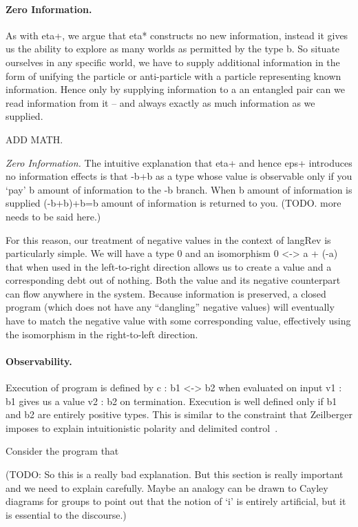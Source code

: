 \documentclass[preprint]{sigplanconf}
\begin{document}
\paragraph*{Zero Information.}
As with {{eta+}}, we argue that {{eta*}} constructs no new
information, instead it gives us the ability to explore as many worlds
as permitted by the type {{b}}. So situate ourselves in any specific
world, we have to supply additional information in the form of
unifying the particle or anti-particle with a particle representing
known information. Hence only by supplying information to a an
entangled pair can we read information from it -- and always exactly
as much information as we supplied.

ADD MATH. 

\emph{Zero Information.}  The intuitive explanation that {{eta+}} and
hence {{eps+}} introduces no information effects is that {{-b+b}} as a
type whose value is observable only if you `pay' {{b}} amount of
information to the {{-b}} branch. When {{b}} amount of information is
supplied {{(-b+b)+b=b}} amount of information is returned to
you. (TODO. more needs to be said here.)

For this reason, our treatment of negative values in the context of
{{langRev}} is particularly simple. We will have a type $0$ and an
isomorphism {{0 <-> a + (-a)}} that when used in the left-to-right direction
allows us to create a value and a corresponding debt out of nothing. Both the
value and its negative counterpart can flow anywhere in the system. Because
information is preserved, a closed program (which does not have any
``dangling'' negative values) will eventually have to match the negative
value with some corresponding value, effectively using the isomorphism in the
right-to-left direction. 



\paragraph*{Observability.} 
Execution of program is defined by {{c : b1 <-> b2}} when evaluated on input
{{v1 : b1}} gives us a value {{v2 : b2}} on termination. Execution is well
defined only if {{b1}} and {{b2}} are entirely positive types. This is
similar to the constraint that Zeilberger imposes to explain intuitionistic
polarity and delimited control~\cite{10.1109/LICS.2010.23}.

Consider the program that

(TODO: So this is a really bad explanation. But this section is really
important and we need to explain carefully. Maybe an analogy can be
drawn to Cayley diagrams for groups to point out that the notion of
`i' is entirely artificial, but it is essential to the discourse.)
\end{document}
